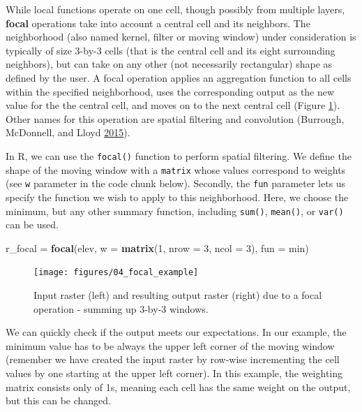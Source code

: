 \documentclass[]{krantz}
\newenvironment{Shaded}{\begin{snugshade}}{\end{snugshade}}
\newcommand{\DataTypeTok}[1]{\textcolor[rgb]{0.27,0.27,0.27}{#1}}
\newcommand{\DecValTok}[1]{\textcolor[rgb]{0.06,0.06,0.06}{#1}}
\newcommand{\KeywordTok}[1]{\textcolor[rgb]{0.27,0.27,0.27}{\textbf{#1}}}
\newcommand{\NormalTok}[1]{#1}
\newcommand{\StringTok}[1]{\textcolor[rgb]{0.5,0.5,0.5}{#1}}
\begin{document}
While local functions operate on one cell, though possibly from multiple layers, \textbf{focal} operations take into account a central cell and its neighbors.
The neighborhood (also named kernel, filter or moving window) under consideration is typically of size 3-by-3 cells (that is the central cell and its eight surrounding neighbors), but can take on any other (not necessarily rectangular) shape as defined by the user.
A focal operation applies an aggregation function to all cells within the specified neighborhood, uses the corresponding output as the new value for the the central cell, and moves on to the next central cell (Figure \ref{fig:focal-example}).
Other names for this operation are spatial filtering and convolution (Burrough, McDonnell, and Lloyd \protect\hyperlink{ref-burrough_principles_2015}{2015}).

In R, we can use the \texttt{focal()} function to perform spatial filtering.
We define the shape of the moving window with a \texttt{matrix} whose values correspond to weights (see \texttt{w} parameter in the code chunk below).
Secondly, the \texttt{fun} parameter lets us specify the function we wish to apply to this neighborhood.
Here, we choose the minimum, but any other summary function, including \texttt{sum()}, \texttt{mean()}, or \texttt{var()} can be used.

\begin{Shaded}
\begin{Highlighting}[]
\NormalTok{r_focal =}\StringTok{ }\KeywordTok{focal}\NormalTok{(elev, }\DataTypeTok{w =} \KeywordTok{matrix}\NormalTok{(}\DecValTok{1}\NormalTok{, }\DataTypeTok{nrow =} \DecValTok{3}\NormalTok{, }\DataTypeTok{ncol =} \DecValTok{3}\NormalTok{), }\DataTypeTok{fun =}\NormalTok{ min)}
\end{Highlighting}
\end{Shaded}

\begin{figure}[t]

{\centering \texttt{[image: figures/04\_focal\_example]} 

}

\caption[Illustration of a focal operation.]{Input raster (left) and resulting output raster (right) due to a focal operation - summing up 3-by-3 windows.}\label{fig:focal-example}
\end{figure}

We can quickly check if the output meets our expectations.
In our example, the minimum value has to be always the upper left corner of the moving window (remember we have created the input raster by row-wise incrementing the cell values by one starting at the upper left corner).
In this example, the weighting matrix consists only of 1s, meaning each cell has the same weight on the output, but this can be changed.
\end{document}
